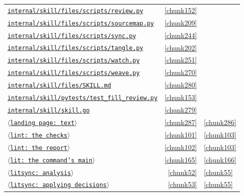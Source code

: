 \documentclass[10pt,a4paper]{article}
\newcounter{chunk}
\newcommand{\chunkname}[1]{\ensuremath{\langle}\texttt{#1}\ensuremath{\rangle}}
\begin{document}
\begin{longtable}{@{}p{}rp{}@{}}
\hyperref[chunk152]{\texttt{internal/\allowbreak{}skill/\allowbreak{}files/\allowbreak{}scripts/\allowbreak{}review.\allowbreak{}py}} & \ref*{chunk152} &  \\
\hyperref[chunk209]{\texttt{internal/\allowbreak{}skill/\allowbreak{}files/\allowbreak{}scripts/\allowbreak{}sourcemap.\allowbreak{}py}} & \ref*{chunk209} &  \\
\hyperref[chunk244]{\texttt{internal/\allowbreak{}skill/\allowbreak{}files/\allowbreak{}scripts/\allowbreak{}sync.\allowbreak{}py}} & \ref*{chunk244} &  \\
\hyperref[chunk202]{\texttt{internal/\allowbreak{}skill/\allowbreak{}files/\allowbreak{}scripts/\allowbreak{}tangle.\allowbreak{}py}} & \ref*{chunk202} &  \\
\hyperref[chunk251]{\texttt{internal/\allowbreak{}skill/\allowbreak{}files/\allowbreak{}scripts/\allowbreak{}watch.\allowbreak{}py}} & \ref*{chunk251} &  \\
\hyperref[chunk270]{\texttt{internal/\allowbreak{}skill/\allowbreak{}files/\allowbreak{}scripts/\allowbreak{}weave.\allowbreak{}py}} & \ref*{chunk270} &  \\
\hyperref[chunk280]{\texttt{internal/\allowbreak{}skill/\allowbreak{}files/\allowbreak{}SKILL.\allowbreak{}md}} & \ref*{chunk280} &  \\
\hyperref[chunk153]{\texttt{internal/\allowbreak{}skill/\allowbreak{}pytests/\allowbreak{}test\_\allowbreak{}fill\_\allowbreak{}review.\allowbreak{}py}} & \ref*{chunk153} &  \\
\hyperref[chunk279]{\texttt{internal/\allowbreak{}skill/\allowbreak{}skill.\allowbreak{}go}} & \ref*{chunk279} &  \\
\hyperref[chunk287]{\chunkname{landing page: text}} & \ref*{chunk287} & \hyperref[chunk286]{\ref*{chunk286}} \\
\hyperref[chunk101]{\chunkname{lint: the checks}} & \ref*{chunk101} & \hyperref[chunk103]{\ref*{chunk103}} \\
\hyperref[chunk102]{\chunkname{lint: the report}} & \ref*{chunk102} & \hyperref[chunk103]{\ref*{chunk103}} \\
\hyperref[chunk165]{\chunkname{lit: the command's main}} & \ref*{chunk165} & \hyperref[chunk166]{\ref*{chunk166}} \\
\hyperref[chunk52]{\chunkname{litsync: analysis}} & \ref*{chunk52} & \hyperref[chunk55]{\ref*{chunk55}} \\
\hyperref[chunk53]{\chunkname{litsync: applying decisions}} & \ref*{chunk53} & \hyperref[chunk55]{\ref*{chunk55}} \\

\end{longtable}
\end{document}
